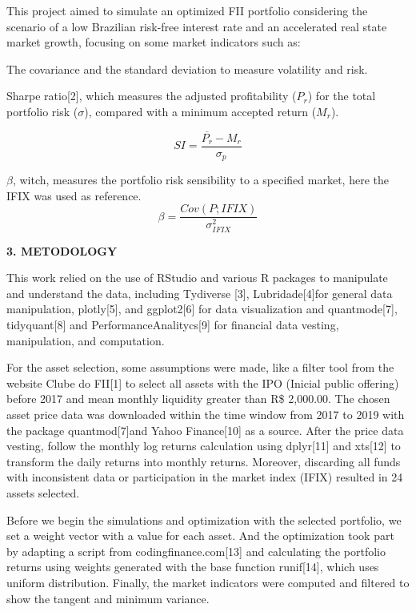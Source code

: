 \documentclass[
]{article}
\begin{document}
This project aimed to simulate an optimized FII portfolio considering
the scenario of a low Brazilian risk-free interest rate and an
accelerated real state market growth, focusing on some market indicators
such as:

The covariance and the standard deviation to measure volatility and
risk.

Sharpe ratio{[}2{]}, which measures the adjusted profitability (\(P_r\))
for the total portfolio risk (\(\sigma\)), compared with a minimum
accepted return (\(M_r\)).

\[ SI=\frac{\overline{P_r}-M_r}{\sigma_{p}} \]

\(\beta\), witch, measures the portfolio risk sensibility to a specified
market, here the IFIX was used as
reference.\[\beta=\frac{Cov(P;IFIX)}{\sigma_{IFIX}^2}\]

\begin{center}
\textbf{3. METODOLOGY}
\end{center}

This work relied on the use of RStudio and various R packages to
manipulate and understand the data, including Tydiverse {[}3{]},
Lubridade{[}4{]}for general data manipulation, plotly{[}5{]}, and
ggplot2{[}6{]} for data visualization and quantmode{[}7{]},
tidyquant{[}8{]} and PerformanceAnalitycs{[}9{]} for financial data
vesting, manipulation, and computation.

For the asset selection, some assumptions were made, like a filter tool
from the website Clube do FII{[}1{]} to select all assets with the IPO
(Inicial public offering) before 2017 and mean monthly liquidity greater
than R\$ 2,000.00. The chosen asset price data was downloaded within the
time window from 2017 to 2019 with the package quantmod{[}7{]}and Yahoo
Finance{[}10{]} as a source. After the price data vesting, follow the
monthly log returns calculation using dplyr{[}11{]} and xts{[}12{]} to
transform the daily returns into monthly returns. Moreover, discarding
all funds with inconsistent data or participation in the market index
(IFIX) resulted in 24 assets selected.

Before we begin the simulations and optimization with the selected
portfolio, we set a weight vector with a value for each asset. And the
optimization took part by adapting a script from
codingfinance.com{[}13{]} and calculating the portfolio returns using
weights generated with the base function runif{[}14{]}, which uses
uniform distribution. Finally, the market indicators were computed and
filtered to show the tangent and minimum variance.
\end{document}
